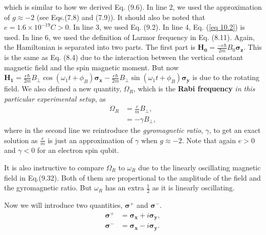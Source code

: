 \documentclass{article}
\begin{document}
which is similar to how we derived Eq. (9.6). In line 2, we used the approximation of $g\approx-2$ (see Eqs.(7.8) and (7.9)).
It should also be noted that $e=1.6\times10^{-19}C>0$. In line 3, we used Eq. (9.2).
In line 4, Eq. (\ref{eq 10.2}) is used. In line 6, we used the definition of Larmor frequency in 
Eq. (8.11). Again, the Hamiltonian is separated into two parts. The first part is $\boldsymbol{H_0}=\frac{-e\hbar}{2m}B_0\boldsymbol{\sigma_z}$. This 
is the same as Eq. (8.4) due to the interaction between the vertical constant magnetic field and the
spin magnetic moment. But now $\boldsymbol{H_1}=\frac{e\hbar}{2m}B_\bot\cos(\omega_1t+\phi_B)\boldsymbol{\sigma_x}-\frac{e\hbar}{2m}B_\bot\sin(\omega_1t+\phi_B)\boldsymbol{\sigma_y}$
is due to the rotating field. We also defined a new quantity, $\Omega_R$, which is the \textbf{Rabi frequency}
\textit{in this particular experimental setup}, as
\begin{align*}\label{eq 10.4}
    \varOmega_R&=\frac{e}{m}B_\bot,\\
    &=-\gamma B_\bot, \tag{10.4}
\end{align*}
where in the second line we reintroduce the \textit{gyromagnetic ratio}, $\gamma$, to get an exact solution as 
$\frac{e}{m}$ is just an approximation of $\gamma$ when $g\approx-2$. Note that again $e>0$ and $\gamma<0$ for an
electron spin qubit.

It is also instructive to compare $\varOmega_R$ to $\omega_R$ due to the linearly oscillating magnetic
field in Eq.(9.32). Both of them are propertional to the amplitude of the field and the gyromagnetic
ratio. But $\omega_R$ has an extra $\frac{1}{2}$ as it is linearly oscillating. 

Now we will introduce two quantities, $\boldsymbol{\sigma^+}$ and $\boldsymbol{\sigma^-}$.
\begin{align*}\label{eq 10.5}
    \boldsymbol{\sigma^+}&=\boldsymbol{\sigma_x}+i\boldsymbol{\sigma_y},\\
    \boldsymbol{\sigma^-}&=\boldsymbol{\sigma_x}-i\boldsymbol{\sigma_y}.\tag{10.5}
\end{align*}
\end{document}
